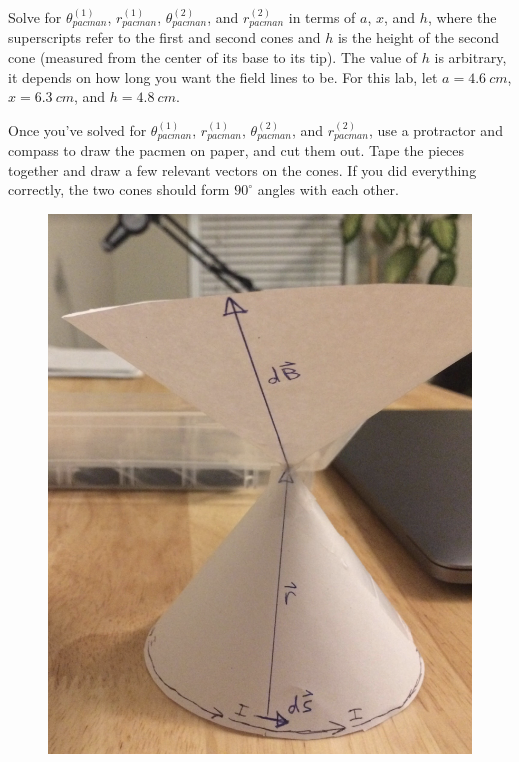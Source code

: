 Solve for $\theta_{pacman}^{(1)}$, $r_{pacman}^{(1)}$, $\theta_{pacman}^{(2)}$, and $r_{pacman}^{(2)}$ in terms of $a$, $x$, and $h$, where the superscripts refer to the first and second cones and $h$ is the height of the second cone (measured from the center of its base to its tip).
The value of $h$ is arbitrary, it depends on how long you want the field lines to be.
For this lab, let $a = 4.6 \ cm$, $x = 6.3 \ cm$, and $h = 4.8 \ cm$.

\vspace{\baselineskip}

Once you've solved for $\theta_{pacman}^{(1)}$, $r_{pacman}^{(1)}$, $\theta_{pacman}^{(2)}$, and $r_{pacman}^{(2)}$, use a protractor and compass to draw the pacmen on paper, and cut them out.
Tape the pieces together and draw a few relevant vectors on the cones.
If you did everything correctly, the two cones should form $90^\circ$ angles with each other.

\begin{figure}[H]
\includegraphics[scale=0.35]{figures/biot-savart/photo.png}
\end{figure}

\pagebreak \clearpage
